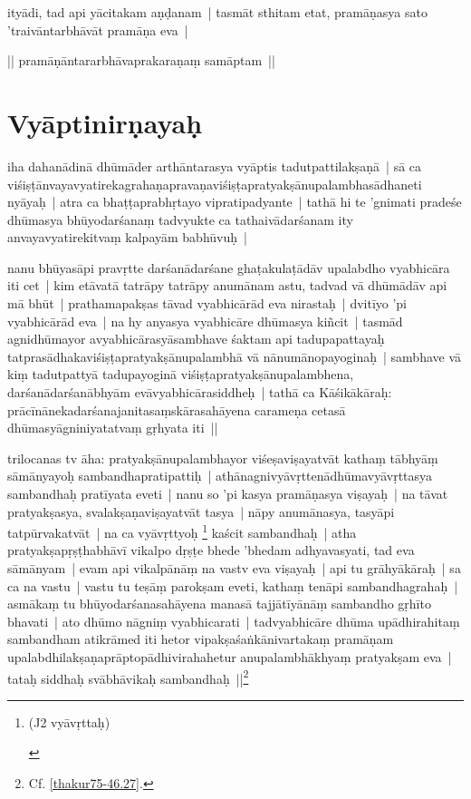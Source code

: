 \documentclass[article,12pt,a4paper]{memoir}
\newcommand{\persName}[1]{#1}
\begin{document}
	  \pstart ityādi, tad api yācitakam aṇḍanam | tasmāt sthitam etat, pramāṇasya sato 'traivāntarbhāvāt pramāṇa eva |
	\pend
      

	  \pstart || pramāṇāntararbhāvaprakaraṇaṃ samāptam || 
	\pend
      
	  
	
\chapter[{Vyāptinirṇayaḥ}]{Vyāptinirṇayaḥ}\label{Vyāptinirṇayaḥ}

	  \pstart iha dahanādinā dhūmāder arthāntarasya vyāptis tadutpattilakṣaṇā | sā ca viśiṣṭānvayavyatirekagrahaṇapravaṇaviśiṣṭapratyakṣānupalambhasādhaneti nyāyaḥ | atra ca bhaṭṭaprabhṛtayo vipratipadyante | tathā hi te 'gnimati pradeśe dhūmasya bhūyodarśanaṃ tadvyukte ca tathaivādarśanam ity anvayavyatirekitvaṃ kalpayām babhūvuḥ | 
	\pend
      

	  \pstart nanu bhūyasāpi pravṛtte darśanādarśane ghaṭakulaṭādāv upalabdho vyabhicāra iti cet | kim etāvatā tatrāpy tatrāpy anumānam astu, tadvad vā dhūmādāv api mā bhūt | prathamapakṣas tāvad vyabhicārād eva nirastaḥ | dvitīyo 'pi vyabhicārād eva | na hy anyasya vyabhicāre dhūmasya kiñcit | tasmād agnidhūmayor avyabhicārasyāsambhave śaktam api tadupapattayaḥ tatprasādhakaviśiṣṭapratyakṣānupalambhā vā nānumānopayoginaḥ | sambhave vā kiṃ tadutpattyā tadupayoginā viśiṣṭapratyakṣānupalambhena, darśanādarśanābhyām evāvyabhicārasiddheḥ | tathā ca Kāśikākāraḥ: prācīnānekadarśanajanitasaṃskārasahāyena carameṇa cetasā dhūmasyāgniniyatatvaṃ gṛhyata iti ||
	\pend
      

	  \pstart \persName{trilocanas} tv āha: pratyakṣānupalambhayor viśeṣaviṣayatvāt kathaṃ tābhyāṃ sāmānyayoḥ sambandhapratipattiḥ | athānagnivyāvṛttenādhūmavyāvṛttasya sambandhaḥ pratīyata eveti | nanu so 'pi kasya pramāṇasya viṣayaḥ | na tāvat pratyakṣasya, svalakṣaṇaviṣayatvāt tasya | nāpy anumānasya, tasyāpi tatpūrvakatvāt | na ca vyāvṛttyoḥ \footnote{\begin{english}(J2 vyāvṛttaḥ)\end{english}} kaścit sambandhaḥ | atha pratyakṣapṛṣṭhabhāvī vikalpo dṛṣṭe bhede 'bhedam adhyavasyati, tad eva sāmānyam | evam api vikalpānāṃ na vastv eva viṣayaḥ | api tu grāhyākāraḥ | sa ca na vastu | vastu tu teṣāṃ parokṣam eveti, kathaṃ tenāpi sambandhagrahaḥ | asmākaṃ tu bhūyodarśanasahāyena manasā tajjātīyānāṃ sambandho gṛhīto bhavati | ato dhūmo nāgniṃ vyabhicarati | tadvyabhicāre dhūma upādhirahitaṃ sambandham atikrāmed iti hetor vipakṣaśaṅkānivartakaṃ pramāṇam upalabdhilakṣaṇaprāptopādhivirahahetur anupalambhākhyaṃ pratyakṣam eva | tataḥ siddhaḥ svābhāvikaḥ sambandhaḥ ||\footnote{Cf. \cref{thakur75-46.27}.}
	\pend
      
\end{document}
